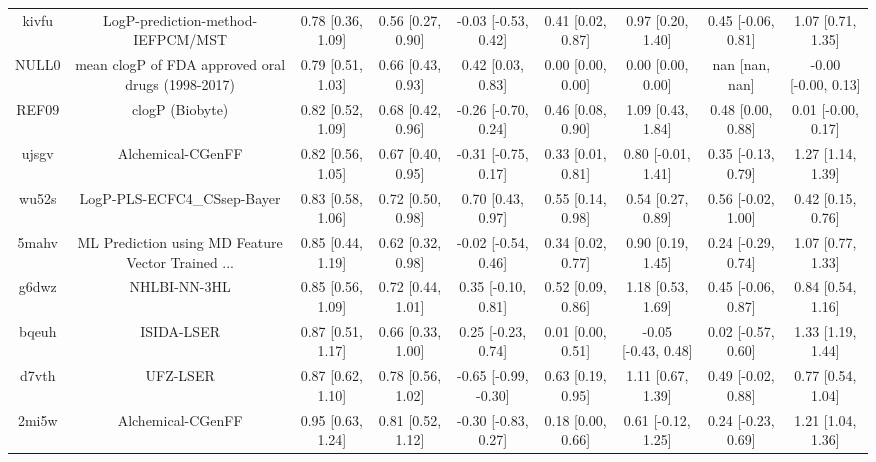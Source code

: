\documentclass{article}
\begin{document}
\begin{center}
\begin{longtable}{|ccccccccc|}
 kivfu &                  LogP-prediction-method-IEFPCM/MST &  0.78 [0.36, 1.09] &  0.56 [0.27, 0.90] &   -0.03 [-0.53, 0.42] &  0.41 [0.02, 0.87] &    0.97 [0.20, 1.40] &   0.45 [-0.06, 0.81] &     1.07 [0.71, 1.35] \\
 NULL0 &  mean clogP of FDA approved oral drugs (1998-2017) &  0.79 [0.51, 1.03] &  0.66 [0.43, 0.93] &     0.42 [0.03, 0.83] &  0.00 [0.00, 0.00] &    0.00 [0.00, 0.00] &       nan [nan, nan] &   -0.00 [-0.00, 0.13] \\
 REF09 &                                    clogP (Biobyte) &  0.82 [0.52, 1.09] &  0.68 [0.42, 0.96] &   -0.26 [-0.70, 0.24] &  0.46 [0.08, 0.90] &    1.09 [0.43, 1.84] &    0.48 [0.00, 0.88] &    0.01 [-0.00, 0.17] \\
 ujsgv &                                  Alchemical-CGenFF &  0.82 [0.56, 1.05] &  0.67 [0.40, 0.95] &   -0.31 [-0.75, 0.17] &  0.33 [0.01, 0.81] &   0.80 [-0.01, 1.41] &   0.35 [-0.13, 0.79] &     1.27 [1.14, 1.39] \\
 wu52s &                        LogP-PLS-ECFC4\_CSsep-Bayer &  0.83 [0.58, 1.06] &  0.72 [0.50, 0.98] &     0.70 [0.43, 0.97] &  0.55 [0.14, 0.98] &    0.54 [0.27, 0.89] &   0.56 [-0.02, 1.00] &     0.42 [0.15, 0.76] \\
 5mahv &  ML Prediction using MD Feature Vector Trained ... &  0.85 [0.44, 1.19] &  0.62 [0.32, 0.98] &   -0.02 [-0.54, 0.46] &  0.34 [0.02, 0.77] &    0.90 [0.19, 1.45] &   0.24 [-0.29, 0.74] &     1.07 [0.77, 1.33] \\
 g6dwz &                                       NHLBI-NN-3HL &  0.85 [0.56, 1.09] &  0.72 [0.44, 1.01] &    0.35 [-0.10, 0.81] &  0.52 [0.09, 0.86] &    1.18 [0.53, 1.69] &   0.45 [-0.06, 0.87] &     0.84 [0.54, 1.16] \\
 bqeuh &                                         ISIDA-LSER &  0.87 [0.51, 1.17] &  0.66 [0.33, 1.00] &    0.25 [-0.23, 0.74] &  0.01 [0.00, 0.51] &  -0.05 [-0.43, 0.48] &   0.02 [-0.57, 0.60] &     1.33 [1.19, 1.44] \\
 d7vth &                                           UFZ-LSER &  0.87 [0.62, 1.10] &  0.78 [0.56, 1.02] &  -0.65 [-0.99, -0.30] &  0.63 [0.19, 0.95] &    1.11 [0.67, 1.39] &   0.49 [-0.02, 0.88] &     0.77 [0.54, 1.04] \\
 2mi5w &                                  Alchemical-CGenFF &  0.95 [0.63, 1.24] &  0.81 [0.52, 1.12] &   -0.30 [-0.83, 0.27] &  0.18 [0.00, 0.66] &   0.61 [-0.12, 1.25] &   0.24 [-0.23, 0.69] &     1.21 [1.04, 1.36] \\

\end{longtable}
\end{center}
\end{document}
